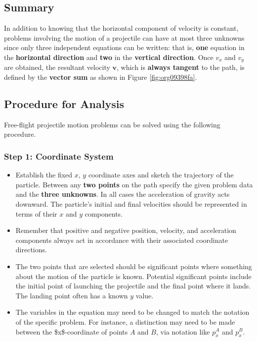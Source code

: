 \documentclass[11pt]{article}
\begin{document}
\subsection{Summary}
\label{sec:org067dd01}

In addition to knowing that the horizontal component of velocity is
constant, problems involving the motion of a projectile can have at
most three unknowns since only three independent equations can be
written: that is, \textbf{one} equation in the \textbf{horizontal direction} and
\textbf{two} in the \textbf{vertical direction}.  Once \(v_x\) and \(v_y\) are obtained,
the resultant velocity \(\mathbf{v}\), which is \textbf{always tangent} to the
path, is defined by the \textbf{vector sum} as shown in Figure \ref{fig:org09398fa}.

\subsection{Procedure for Analysis}
\label{sec:orgd5c1eaf}

Free-flight projectile motion problems can be solved using the
following procedure.

\subsubsection{Step 1: Coordinate System}
\label{sec:org31dfaea}

\begin{itemize}
\item Establish the fixed \(x\), \(y\) coordinate axes and sketch the
trajectory of the particle.  Between any \textbf{two points} on the path
specify the given problem data and the \textbf{three unknowns}.  In all
cases the acceleration of gravity acts downward.  The particle's
initial and final velocities should be represented in terms of their
\(x\) and \(y\) components.

\item Remember that positive and negative position, velocity, and
acceleration components always act in accordance with their
associated coordinate directions.

\item The two points that are selected should be significant points where
something about the motion of the particle is known.  Potential
significant points include the initial point of launching the
projectile and the final point where it lands. The landing point
often has a known \(y\) value.

\item The variables in the equation may need to be changed to match the
notation of the specific problem.  For instance, a distinction may
need to be made between the \$x\$-coordinate of points \(A\) and \(B\),
via notation like \(p_x^A\) and \(p_x^B\).
\end{itemize}
\end{document}
